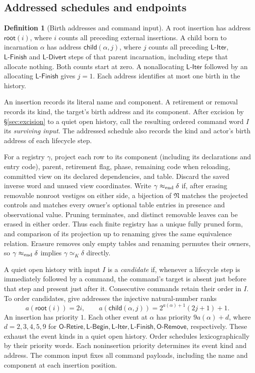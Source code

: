 \documentclass[11pt,a4paper]{article}
\theoremstyle{definition}
\newtheorem{definition}{Definition}[section]
\theoremstyle{plain}
\newcommand{\N}{\mathfrak{N}}
\newcommand{\ORetire}{\mathsf{O\text{-}Retire}}
\newcommand{\ORemove}{\mathsf{O\text{-}Remove}}
\newcommand{\LBegin}{\mathsf{L\text{-}Begin}}
\newcommand{\LIter}{\mathsf{L\text{-}Iter}}
\newcommand{\LFinish}{\mathsf{L\text{-}Finish}}
\newcommand{\LDivert}{\mathsf{L\text{-}Divert}}
\begin{document}
\subsection{Addressed schedules and endpoints}
\label{sec:t80-repair}

\begin{definition}[Birth addresses and command input]
A root insertion has address $\mathsf{root}(i)$, where $i$ counts all preceding external insertions. A child born to incarnation $\alpha$ has address $\mathsf{child}(\alpha,j)$, where $j$ counts all preceding $\LIter$, $\LFinish$ and $\LDivert$ steps of that parent incarnation, including steps that allocate nothing. Both counts start at zero. A nonallocating $\LIter$ followed by an allocating $\LFinish$ gives $j=1$. Each address identifies at most one birth in the history.

An insertion records its literal name and component. A retirement or removal records its kind, the target's birth address and its component. After excision by \S\ref{sec:excision} to a quiet open history, call the resulting ordered command word $I$ its \emph{surviving input}. The addressed schedule also records the kind and actor's birth address of each lifecycle step.
\end{definition}

For a registry $\gamma$, project each row to its component (including its declarations and entry code), parent, retirement flag, phase, remaining code when reloading, committed view on its declared dependencies, and table. Discard the saved inverse word and unused view coordinates.
Write $\gamma\approx_{\rm end}\delta$ if, after erasing removable nonroot vestiges on either side, a bijection of $\N$ matches the projected controls and matches every owner's optional table entries in presence and observational value. Pruning terminates, and distinct removable leaves can be erased in either order. Thus each finite registry has a unique fully pruned form, and comparison of its projection up to renaming gives the same equivalence relation. Erasure removes only empty tables and renaming permutes their owners, so $\gamma\approx_{\rm end}\delta$ implies $\gamma\simeq_K\delta$ directly.

A quiet open history with input $I$ is a \emph{candidate} if, whenever a lifecycle step is immediately followed by a command, the command's target is absent just before that step and present just after it. Consecutive commands retain their order in $I$.
To order candidates, give addresses the injective natural-number ranks
\[
 a(\mathsf{root}(i))=2i,\qquad
 a(\mathsf{child}(\alpha,j))=2^{a(\alpha)+1}(2j+1)+1.
\]
An insertion has priority $1$. Each other event at $\alpha$ has priority $9a(\alpha)+d$, where $d=2,3,4,5,9$ for $\ORetire,\LBegin,\LIter,\LFinish,\ORemove$, respectively. These exhaust the event kinds in a quiet open history. Order schedules lexicographically by their priority words. Each noninsertion priority determines its event kind and address. The common input fixes all command payloads, including the name and component at each insertion position.
\end{document}
